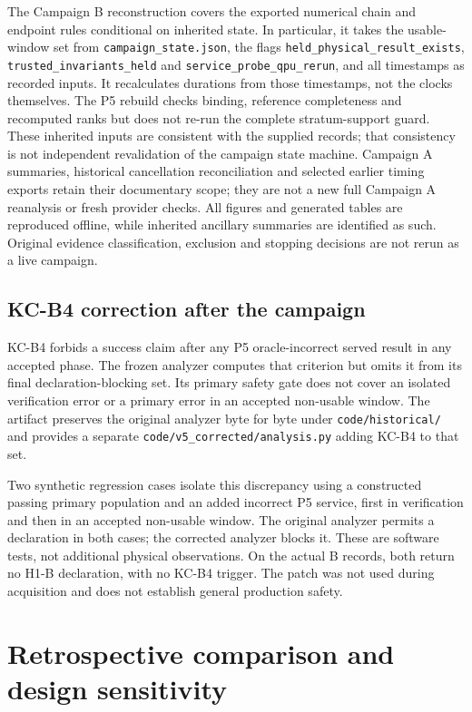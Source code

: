 \documentclass[11pt,a4paper]{article}
\begin{document}
The Campaign B reconstruction covers the exported numerical chain and endpoint rules conditional on inherited state. In particular, it takes the usable-window set from \texttt{campaign\_state.json}, the flags \texttt{held\_physical\_result\_exists}, \texttt{trusted\_invariants\_held} and \texttt{service\_probe\_qpu\_rerun}, and all timestamps as recorded inputs. It recalculates durations from those timestamps, not the clocks themselves. The P5 rebuild checks binding, reference completeness and recomputed ranks but does not re-run the complete stratum-support guard. These inherited inputs are consistent with the supplied records; that consistency is not independent revalidation of the campaign state machine. Campaign A summaries, historical cancellation reconciliation and selected earlier timing exports retain their documentary scope; they are not a new full Campaign A reanalysis or fresh provider checks. All figures and generated tables are reproduced offline, while inherited ancillary summaries are identified as such. Original evidence classification, exclusion and stopping decisions are not rerun as a live campaign.

\subsection{KC-B4 correction after the campaign}
KC-B4 forbids a success claim after any P5 oracle-incorrect served result in any accepted phase. The frozen analyzer computes that criterion but omits it from its final declaration-blocking set. Its primary safety gate does not cover an isolated verification error or a primary error in an accepted non-usable window. The artifact preserves the original analyzer byte for byte under \texttt{code/historical/} and provides a separate \texttt{code/v5\_corrected/analysis.py} adding KC-B4 to that set.

Two synthetic regression cases isolate this discrepancy using a constructed passing primary population and an added incorrect P5 service, first in verification and then in an accepted non-usable window. The original analyzer permits a declaration in both cases; the corrected analyzer blocks it. These are software tests, not additional physical observations. On the actual B records, both return no H1-B declaration, with no KC-B4 trigger. The patch was not used during acquisition and does not establish general production safety.

\section{Retrospective comparison and design sensitivity}
\end{document}

